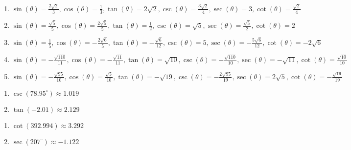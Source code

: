 \begin{enumerate}
\item $\sin(\theta) = \frac{2\sqrt{2}}{3}, \cos(\theta) = \frac{1}{3}, \tan(\theta) = 2\sqrt{2}, \csc(\theta) = \frac{3\sqrt{2}}{4}, \sec(\theta) = 3, \cot(\theta) = \frac{\sqrt{2}}{4}$

\item $\sin(\theta) = \frac{\sqrt{5}}{5}, \cos(\theta) = \frac{2\sqrt{5}}{5}, \tan(\theta) = \frac{1}{2}, \csc(\theta) = \sqrt{5}, \sec(\theta) = \frac{\sqrt{5}}{2}, \cot(\theta) = 2$

\item $\sin(\theta) = \frac{1}{5}, \cos(\theta) = -\frac{2\sqrt{6}}{5}, \tan(\theta) = -\frac{\sqrt{6}}{12}, \csc(\theta) = 5, \sec(\theta) = -\frac{5\sqrt{6}}{12}, \cot(\theta) = -2\sqrt{6}$

\item $\sin(\theta) = -\frac{\sqrt{110}}{11}, \cos(\theta) = -\frac{\sqrt{11}}{11}, \tan(\theta) = \sqrt{10}, \csc(\theta) = -\frac{\sqrt{110}}{10}, \sec(\theta) = -\sqrt{11}, \cot(\theta) = \frac{\sqrt{10}}{10}$

\item $\sin(\theta) = -\frac{\sqrt{95}}{10}, \cos(\theta) = \frac{\sqrt{5}}{10}, \tan(\theta) = -\sqrt{19}, \csc(\theta) = -\frac{2\sqrt{95}}{19}, \sec(\theta) = 2\sqrt{5}, \cot(\theta) = -\frac{\sqrt{19}}{19}$

\setcounter{HW}{\value{enumi}}

\end{enumerate}

\begin{multicols}{2}

\begin{enumerate}

\setcounter{enumi}{\value{HW}}

\item $\csc(78.95^{\circ}) \approx 1.019$
\item $\tan(-2.01) \approx 2.129$

\setcounter{HW}{\value{enumi}}

\end{enumerate}

\end{multicols}

\begin{multicols}{2}

\begin{enumerate}

\setcounter{enumi}{\value{HW}}

\item $\cot(392.994) \approx 3.292$
\item $\sec(207^{\circ}) \approx -1.122$

\setcounter{HW}{\value{enumi}}

\end{enumerate}

\end{multicols}

